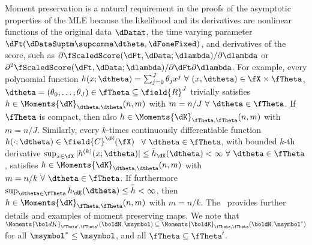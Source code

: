 Moment preservation is a natural requirement in the proofs of the asymptotic properties of the MLE because the likelihood and its derivatives are nonlinear functions of the original data $\dDatat$, the time varying parameter $\dFt(\dDataSuptm\supcomma\dtheta,\dFoneFixed)$, and derivatives of the score, such as $\partial\fScaledScore(\dFt,\dData;\dlambda)/\partial\dlambda$
or
$\partial^2\fScaledScore(\dFt,\dData;\dlambda)/\partial\dFt\partial\dlambda$.
For example, every polynomial function  $h(x;\dtheta)=\sum_{j=0}^{J} \theta_{j}x^{j} \ \forall \ (x,\dtheta) \in \fX \times \fTheta$, $\dtheta=(\theta_{0},\ldots,\theta_{J}) \in \fTheta \subseteq \field{R}^{J}$ trivially satisfies $h \in \Moments{\dK}_{\dtheta,\dtheta}(n,m)$  with $m=n/J\ \forall \ \dtheta \in \fTheta$. If  $\fTheta$ is compact, then also $h \in \Moments{\dK}_{\fTheta,\fTheta}(n,m)$  with $m=n/J$.
%
%
Similarly, every $k$-times continuously differentiable function $h(\cdot;\dtheta) \in \field{C}^{\dK}(\fX)$ $ \ \forall \ \dtheta \in \fTheta$, with bounded $k$-th derivative $\sup_{x \in \fX}|h^{(k)}(x;\dtheta)| \leq \bar{h}_{\dK}(\dtheta)<\infty \ \forall \ \dtheta \in \fTheta$, satisfies $h \in \Moments{\dK}_{\dtheta,\dtheta}(n,m)$ with $m=n/k \ \forall \ \dtheta \in \fTheta$. If furthermore $\sup_{\dtheta \in \fTheta}\bar{h}_{\dK}(\dtheta) \leq \bar{\bar{h}}_{}<\infty$, then $h \in \Moments{\dK}_{\fTheta,\fTheta}(n,m)$ with $m=n/k$.
The \SupplementaryAppendix\ provides further details and examples of moment preserving maps.
We note that
$ \Moments{\bol dK}_{\fTheta',\fTheta'}(\boldN,\msymbol)  
\subseteq \Moments{\boldK}_{\fTheta,\fTheta}(\boldN,\msymbol^{*})$
for all $\msymbol^{*} \leq \msymbol$, and all $\fTheta \subseteq \fTheta'$.


